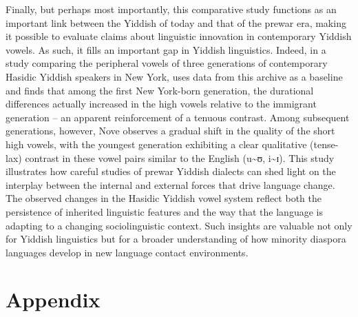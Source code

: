 \documentclass[output=paper,colorlinks,citecolor=brown]{langscibook}
\begin{document}
Finally, but perhaps most importantly, this comparative study functions as an important link between the Yiddish of today and that of the prewar era, making it possible to evaluate claims about linguistic innovation in contemporary Yiddish vowels. As such, it fills an important gap in Yiddish linguistics. Indeed, in a study comparing the peripheral vowels of three generations of contemporary Hasidic Yiddish speakers in New York, \citet{Nove2021} uses data from this archive as a baseline and finds that among the first New York-born generation, the durational differences actually increased in the high vowels relative to the immigrant generation – an apparent reinforcement of a tenuous contrast. Among subsequent generations, however, Nove observes a gradual shift in the quality of the short high vowels, with the youngest generation exhibiting a clear qualitative (tense-lax) contrast in these vowel pairs similar to the English (u{\textasciitilde}ʊ, i{\textasciitilde}ɪ). This study illustrates how careful studies of prewar Yiddish dialects can shed light on the interplay between the internal and external forces that drive language change. The observed changes in the Hasidic Yiddish vowel system reflect both the persistence of inherited linguistic features and the way that the language is adapting to a changing sociolinguistic context. Such insights are valuable not only for Yiddish linguistics but for a broader understanding of how minority diaspora languages develop in new language contact environments.




\section*{Appendix} %
\label{sec:nove:AppendixA}

\end{document}
